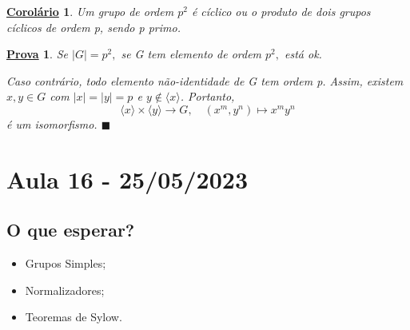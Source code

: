 \documentclass{article}
\newtheorem*{crl*}{\underline{Corol\'ario}}
\newtheorem*{proof*}{\underline{Prova}}
\renewcommand\qedsymbol{$\blacksquare$}
\begin{document}
\begin{crl*}
  Um grupo de ordem \(p^{2}\) é cíclico ou o produto de dois grupos cíclicos de ordem p, sendo p primo.
\end{crl*}
\begin{proof*}
  Se \(|G| = p^{2},\) se G tem elemento de ordem \(p^{2},\) está ok.

  Caso contrário, todo elemento não-identidade de G tem ordem p. Assim, existem 
 \(x, y\in G\) com \(|x|=|y| = p\) e \(y\not\in\langle x\rangle\). Portanto, 
   \[
     \langle x\rangle \times\langle y\rangle\rightarrow G, \quad (x^{m}, y^{n})\mapsto x^{m}y^{n}
   \]
  é um isomorfismo. \qedsymbol
\end{proof*}
\newpage

\section{Aula 16 - 25/05/2023}
\subsection{O que esperar?}
\begin{itemize}
  \item Grupos Simples;
  \item Normalizadores;
  \item Teoremas de Sylow.
\end{itemize}
\end{document}
